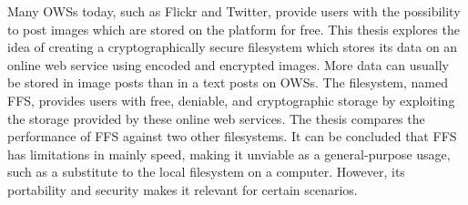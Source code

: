 




Many \gls{OWS}s today, such as Flickr and Twitter, provide users with the possibility to post images which are stored on the platform for free. This thesis explores the idea of creating a cryptographically secure filesystem which stores its data on an online web service using encoded and encrypted images. More data can usually be stored in image posts than in a text posts on \gls{OWS}s. The filesystem, named \gls{FFS}, provides users with free, deniable, and cryptographic storage by exploiting the storage provided by these online web services. The thesis compares the performance of \gls{FFS} against two other filesystems. It can be concluded that \gls{FFS} has limitations in mainly speed, making it unviable as a \mbox{general-purpose} usage, such as a substitute to the local filesystem on a computer. However, its portability and security makes it relevant for certain scenarios.
